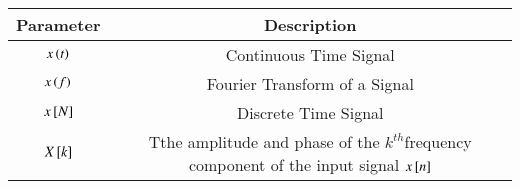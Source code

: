 \begin{tabular}{|c|c|}
\hline
Parameter & Description \\
\hline
$x\left(t\right)$  & Continuous Time  Signal\\
\hline
$x\left(f\right)$ & Fourier Transform of a Signal \\
\hline
$x{}\left[N\right]$ & Discrete Time Signal\\
\hline
$X{}\left[k\right]$ &  Tthe amplitude and phase of the $k^{th}$frequency component of the input signal $x{}\left[n\right]$\\
\hline
\end{tabular}